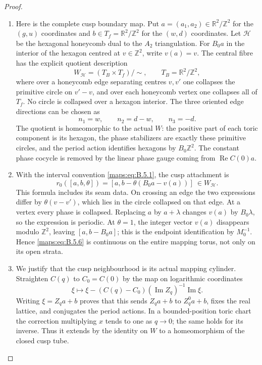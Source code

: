 \begin{proof}
\begin{enumerate}[label=\arabic*.,leftmargin=*]
\item Here is the complete cusp boundary map.  Put
$a=(a_1,a_2)\in\mathbb R^2/\mathbb Z^2$ for the $(g,u)$
coordinates and $b\in T_f=\mathbb R^2/\mathbb Z^2$ for
the $(w,d)$ coordinates.  Let $\mathcal H$ be the hexagonal
honeycomb dual to the $A_2$ triangulation.  For $B_0a$ in
the interior of the hexagon centred at $v\in\mathbb Z^2$,
write $v(a)=v$.  The central fibre has the explicit quotient
description
\[
 W_{\mathcal H}=(T_B\times T_f)/\sim,
 \qquad T_B=\mathbb R^2/\mathbb Z^2,
 \tag{B.5.4}\label{maps:eq:B.5.4}
\]
where over a honeycomb edge separating centres $v,v'$ one
collapses the primitive circle on $v'-v$, and over each
honeycomb vertex one collapses all of $T_f$.  No circle is
collapsed over a hexagon interior.  The three oriented edge
directions can be chosen as
\[
 n_1=w,\qquad n_2=d-w,\qquad n_3=-d.
 \tag{B.5.5}\label{maps:eq:B.5.5}
\]
The quotient is homeomorphic to the actual $W$: the positive
part of each toric component is its hexagon, the phase
stabilizers are exactly these primitive circles, and the
period action identifies hexagons by $B_0\mathbb Z^2$.
The constant phase cocycle is removed by the linear phase
gauge coming from $\operatorname{Re}C(0)a$.

\item With the interval convention \eqref{maps:eq:B.5.1}, the cusp attachment is
\[
 r_0([a,b,\theta])
   =[a,b-\theta(B_0a-v(a))]\ \in W_{\mathcal H}.
 \tag{B.5.6}\label{maps:eq:B.5.6}
\]
This formula includes its seam data.  On crossing an edge
the two expressions differ by $\theta(v-v')$, which lies
in the circle collapsed on that edge.  At a vertex every
phase is collapsed.  Replacing $a$ by $a+\lambda$ changes
$v(a)$ by $B_0\lambda$, so the expression is periodic.
At $\theta=1$, the integer vector $v(a)$ disappears modulo
$\mathbb Z^2$, leaving $[a,b-B_0a]$; this is the endpoint
identification by $M_0^{-1}$.  Hence \eqref{maps:eq:B.5.6} is continuous
on the entire mapping torus, not only on its open strata.

\item We justify that the cusp neighbourhood is its actual
mapping cylinder.  Straighten $C(q)$ to $C_0=C(0)$ by
the map on logarithmic coordinates
\[
 \xi\longmapsto
 \xi-(C(q)-C_0)(\operatorname{Im}Z_q)^{-1}
                       \operatorname{Im}\xi.
 \tag{B.5.7}\label{maps:eq:B.5.7}
\]
Writing $\xi=Z_qa+b$ proves that this sends $Z_qa+b$ to
$Z_q^0a+b$, fixes the real lattice, and conjugates the
period actions.  In a bounded-position toric chart the
correction multiplying $x$ tends to one as $q\to0$;
the same holds for its inverse.  Thus it extends by the
identity on $W$ to a homeomorphism of the closed cusp tube.


\end{enumerate}
\end{proof}
